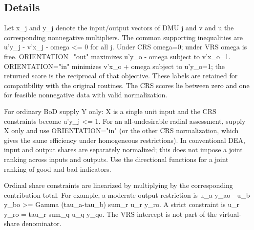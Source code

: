 \documentclass[10pt,a4paper]{article}
\newcommand{\field}[1]{\needspace{3\baselineskip}\subsection*{#1}}
\begin{document}
\field{Details}
Let x\_j and y\_j denote the input/output vectors of DMU j and v and u the corresponding nonnegative multipliers. The common supporting inequalities are u'y\_j - v'x\_j - omega \textless{}= 0 for all j. Under CRS omega=0; under VRS omega is free. ORIENTATION="out" maximizes u'y\_o - omega subject to v'x\_o=1. ORIENTATION="in" minimizes v'x\_o + omega subject to u'y\_o=1; the returned score is the reciprocal of that objective. These labels are retained for compatibility with the original routines. The CRS scores lie between zero and one for feasible nonnegative data with valid normalization.

For ordinary BoD supply Y only: X is a single unit input and the CRS constraints become u'y\_j \textless{}= 1. For an all-undesirable radial assessment, supply X only and use ORIENTATION="in" (or the other CRS normalization, which gives the same efficiency under homogeneous restrictions). In conventional DEA, input and output shares are separately normalized; this does not impose a joint ranking across inputs and outputs. Use the directional functions for a joint ranking of good and bad indicators.

Ordinal share constraints are linearized by multiplying by the corresponding contribution total. For example, a moderate output restriction is u\_a y\_ao - u\_b y\_bo \textgreater{}= Gamma (tau\_a-tau\_b) sum\_r u\_r y\_ro. A strict constraint is u\_r y\_ro = tau\_r sum\_q u\_q y\_qo. The VRS intercept is not part of the virtual-share denominator.
\end{document}
